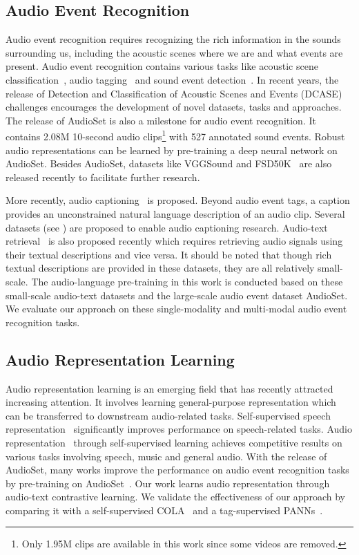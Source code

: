 \documentclass[sigconf]{acmart}
\begin{document}
\subsection{Audio Event Recognition}
Audio event recognition requires recognizing the rich information in the sounds surrounding us, including the acoustic scenes where we are and what events are present.
Audio event recognition contains various tasks like acoustic scene classification~\cite{mesaros2018multi}, audio tagging~\cite{gemmeke2017audio} and sound event detection~\cite{cakir2015polyphonic}.
In recent years, the release of Detection and Classification of Acoustic Scenes and Events (DCASE) challenges encourages the development of novel datasets, tasks and approaches.
The release of AudioSet is also a milestone for audio event recognition.
It contains 2.08M 10-second audio clips\footnote{Only 1.95M clips are available in this work since some videos are removed.} with 527 annotated sound events.
Robust audio representations can be learned by pre-training a deep neural network on AudioSet.
Besides AudioSet, datasets like VGGSound and FSD50K~\cite{fonseca2022fsd50k} are also released recently to facilitate further research.

More recently, audio captioning~\cite{drossos2017automated} is proposed.
Beyond audio event tags, a caption provides an unconstrained natural language description of an audio clip.
Several datasets (see ) are proposed to enable audio captioning research.
Audio-text retrieval~\cite{oncescu21audio} is also proposed recently which requires retrieving audio signals using their textual descriptions and vice versa.
It should be noted that though rich textual descriptions are provided in these datasets, they are all relatively small-scale. 
The audio-language pre-training in this work is conducted based on these small-scale audio-text datasets and the large-scale audio event dataset AudioSet.
We evaluate our approach on these single-modality and multi-modal audio event recognition tasks.

\subsection{Audio Representation Learning}
Audio representation learning is an emerging field that has recently attracted increasing attention.
It involves learning general-purpose representation which can be transferred to downstream audio-related tasks.
Self-supervised speech representation~\cite{baevski2020wav2vec,hsu2021hubert,chen2022wavlm} significantly improves performance on speech-related tasks.
Audio representation~\cite{saeed2021contrastive,al2021clar,niizumi2021byol} through self-supervised learning achieves competitive results on various tasks involving speech, music and general audio.
With the release of AudioSet, many works improve the performance on audio event recognition tasks by pre-training on AudioSet~\cite{kong2020panns,gong2021audio,koutini2021efficient}.
Our work learns audio representation through audio-text contrastive learning.
We validate the effectiveness of our approach by comparing it with a self-supervised COLA~\cite{saeed2021contrastive} and a tag-supervised PANNs~\cite{kong2020panns}.
\end{document}
